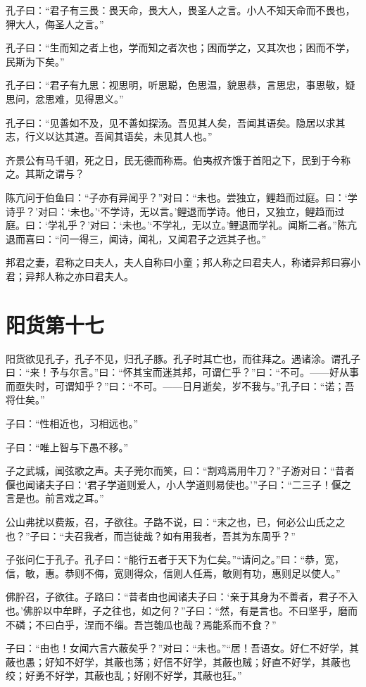\documentclass[twoside,openany]{book}
\begin{document}
孔子曰：“君子有三畏：畏天命，畏大人，畏圣人之言。小人不知天命而不畏也，狎大人，侮圣人之言。”

孔子曰：“生而知之者上也，学而知之者次也；困而学之，又其次也；困而不学，民斯为下矣。”

孔子曰：“君子有九思：视思明，听思聪，色思温，貌思恭，言思忠，事思敬，疑思问，忿思难，见得思义。”

孔子曰：“见善如不及，见不善如探汤。吾见其人矣，吾闻其语矣。隐居以求其志，行义以达其道。吾闻其语矣，未见其人也。”

齐景公有马千驷，死之日，民无德而称焉。伯夷叔齐饿于首阳之下，民到于今称之。其斯之谓与？

陈亢问于伯鱼曰：“子亦有异闻乎？”对曰：“未也。尝独立，鲤趋而过庭。曰：‘学诗乎？’对曰：‘未也。’‘不学诗，无以言。’鲤退而学诗。他日，又独立，鲤趋而过庭。曰：‘学礼乎？’对曰：‘未也。’‘不学礼，无以立。’鲤退而学礼。闻斯二者。”陈亢退而喜曰：“问一得三，闻诗，闻礼，又闻君子之远其子也。”

邦君之妻，君称之曰夫人，夫人自称曰小童；邦人称之曰君夫人，称诸异邦曰寡小君；异邦人称之亦曰君夫人。


\chapter{阳货第十七}\label{ch17}

阳货欲见孔子，孔子不见，归孔子豚。孔子时其亡也，而往拜之。遇诸涂。谓孔子曰：“来！予与尔言。”曰：“怀其宝而迷其邦，可谓仁乎？”曰：“不可。——好从事而亟失时，可谓知乎？”曰：“不可。——日月逝矣，岁不我与。”孔子曰：“诺；吾将仕矣。”

子曰：“性相近也，习相远也。”

子曰：“唯上智与下愚不移。”

子之武城，闻弦歌之声。夫子莞尔而笑，曰：“割鸡焉用牛刀？”子游对曰：“昔者偃也闻诸夫子曰：‘君子学道则爱人，小人学道则易使也。’”子曰：“二三子！偃之言是也。前言戏之耳。”

公山弗扰以费叛，召，子欲往。子路不说，曰：“末之也，已，何必公山氏之之也？”子曰：“夫召我者，而岂徒哉？如有用我者，吾其为东周乎？”

子张问仁于孔子。孔子曰：“能行五者于天下为仁矣。”“请问之。”曰：“恭，宽，信，敏，惠。恭则不侮，宽则得众，信则人任焉，敏则有功，惠则足以使人。”

佛肸召，子欲往。子路曰：“昔者由也闻诸夫子曰：‘亲于其身为不善者，君子不入也。’佛肸以中牟畔，子之往也，如之何？”子曰：“然，有是言也。不曰坚乎，磨而不磷；不曰白乎，涅而不缁。吾岂匏瓜也哉？焉能系而不食？”

子曰：“由也！女闻六言六蔽矣乎？”对曰：“未也。”“居！吾语女。好仁不好学，其蔽也愚；好知不好学，其蔽也荡；好信不好学，其蔽也贼；好直不好学，其蔽也绞；好勇不好学，其蔽也乱；好刚不好学，其蔽也狂。”
\end{document}
